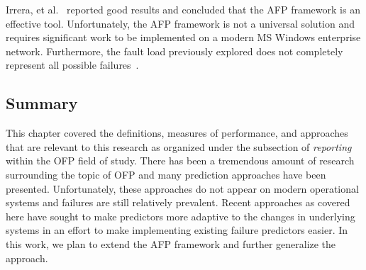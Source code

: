 Irrera, et al.~\cite{irrera2015} reported good results and concluded that the
\ac{AFP} framework is an effective tool.  Unfortunately, the \ac{AFP} framework
is not a universal solution and requires significant work to be implemented on
a modern \ac{MS} Windows enterprise network.  Furthermore, the fault load
previously explored does not completely represent all possible
failures~\cite{kikuchi2014}.

\subsection{Summary} \label{summary}
This chapter covered the definitions, measures of performance, and approaches
that are relevant to this research as organized under the subsection of
\emph{reporting} within the \ac{OFP} field of study.  There has been a
tremendous amount of research surrounding the topic of \ac{OFP} and many
prediction approaches have been presented.  Unfortunately, these approaches do
not appear on modern operational systems and failures are still relatively
prevalent.  Recent approaches as covered here have sought to make predictors
more adaptive to the changes in underlying systems in an effort to make
implementing existing failure predictors easier.  In this work, we plan to
extend the \ac{AFP} framework and further generalize the
approach.  
